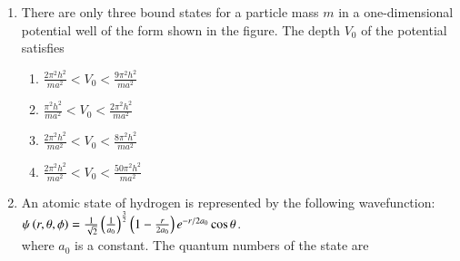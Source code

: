 \documentclass[journal]{IEEEtran}
\begin{document}
\begin{enumerate}[start=35]
\begin{multicols}{4}
    \begin{enumerate}
        \item $2i\hbar x^2$
        \item $-2i\hbar x^2$
        \item $3i\hbar x^2$
        \item $-3i\hbar x^2$
    \end{enumerate}
\end{multicols}
\item There are only three bound states for a particle mass $m$ in a one-dimensional potential well of the form shown in the figure. The depth $V_0$ of the potential satisfies
\begin{minipage}[t]{0.5\textwidth}
\raggedleft
{}
\end{minipage}
\begin{multicols}{2}
    \begin{enumerate}
        \item $\frac{2\pi^2 h^2}{ma^2}<V_0<\frac{9\pi^2 h^2}{ma^2}$
        \item $\frac{\pi^2 h^2}{ma^2}<V_0<\frac{2\pi^2 h^2}{ma^2}$
        \item $\frac{2\pi^2 h^2}{ma^2}<V_0<\frac{8\pi^2 h^2}{ma^2}$
        \item $\frac{2\pi^2 h^2}{ma^2}<V_0<\frac{50\pi^2 h^2}{ma^2}$
    \end{enumerate}
\end{multicols}
\item An atomic state of hydrogen is represented by the following wavefunction:\\
$\psi\left(r,\theta,\phi\right)=\frac{1}{\sqrt{2}}\left(\frac{1}{a_0}\right)^{\frac{3}{2}}\left(1-\frac{r}{2a_0}\right)e^{-r/2a_0}\cos\theta$.\\ where $a_0$ is a constant. The quantum numbers of the state are
\begin{multicols}{2}

\end{multicols}
\end{enumerate}
\end{document}

